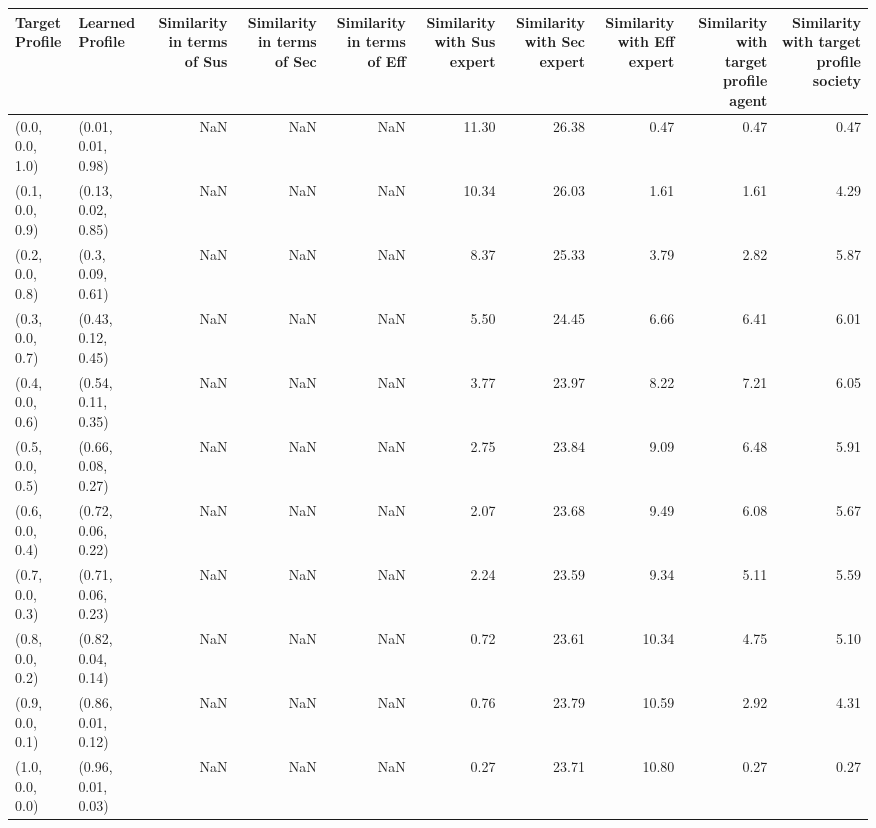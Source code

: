 \begin{tabular}{llrrrrrrrr}
\toprule
Target Profile & Learned Profile & Similarity in terms of Sus & Similarity in terms of Sec & Similarity in terms of Eff & Similarity with Sus expert & Similarity with Sec expert & Similarity with Eff expert & Similarity with target profile agent & Similarity with target profile society \\
\midrule
(0.0, 0.0, 1.0) & (0.01, 0.01, 0.98) & NaN & NaN & NaN & 11.30 & 26.38 & 0.47 & 0.47 & 0.47 \\
(0.1, 0.0, 0.9) & (0.13, 0.02, 0.85) & NaN & NaN & NaN & 10.34 & 26.03 & 1.61 & 1.61 & 4.29 \\
(0.2, 0.0, 0.8) & (0.3, 0.09, 0.61) & NaN & NaN & NaN & 8.37 & 25.33 & 3.79 & 2.82 & 5.87 \\
(0.3, 0.0, 0.7) & (0.43, 0.12, 0.45) & NaN & NaN & NaN & 5.50 & 24.45 & 6.66 & 6.41 & 6.01 \\
(0.4, 0.0, 0.6) & (0.54, 0.11, 0.35) & NaN & NaN & NaN & 3.77 & 23.97 & 8.22 & 7.21 & 6.05 \\
(0.5, 0.0, 0.5) & (0.66, 0.08, 0.27) & NaN & NaN & NaN & 2.75 & 23.84 & 9.09 & 6.48 & 5.91 \\
(0.6, 0.0, 0.4) & (0.72, 0.06, 0.22) & NaN & NaN & NaN & 2.07 & 23.68 & 9.49 & 6.08 & 5.67 \\
(0.7, 0.0, 0.3) & (0.71, 0.06, 0.23) & NaN & NaN & NaN & 2.24 & 23.59 & 9.34 & 5.11 & 5.59 \\
(0.8, 0.0, 0.2) & (0.82, 0.04, 0.14) & NaN & NaN & NaN & 0.72 & 23.61 & 10.34 & 4.75 & 5.10 \\
(0.9, 0.0, 0.1) & (0.86, 0.01, 0.12) & NaN & NaN & NaN & 0.76 & 23.79 & 10.59 & 2.92 & 4.31 \\
(1.0, 0.0, 0.0) & (0.96, 0.01, 0.03) & NaN & NaN & NaN & 0.27 & 23.71 & 10.80 & 0.27 & 0.27 \\
\bottomrule
\end{tabular}
